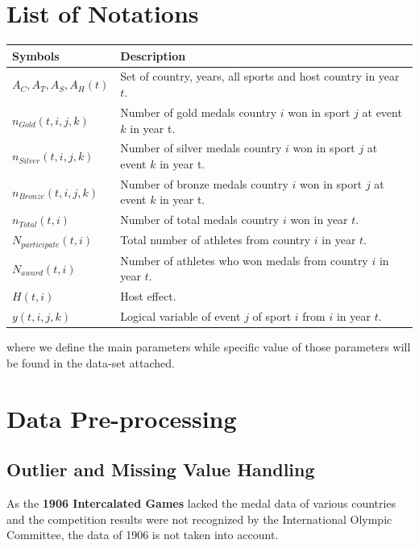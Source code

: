 \documentclass{mcmthesis}
\begin{document}
\section{List of Notations}
\begin{center}
\begin{tabular}{ll}
	\toprule
	{\bf Symbols} & {\bf Description}  \\
	\midrule 
	$A_{C},A_{T},A_{S},A_{H}(t)$ & Set of country, years, all sports and host country in year $t$.\\
	$n_{Gold}(t,i,j,k)$ & Number of gold medals country $i$ won in sport $j$ at event $k$ in year t. \\
	$n_{Silver}(t,i,j,k)$ & Number of silver medals country $i$ won in sport $j$ at event $k$ in year t. \\
	$n_{Bronze}(t,i,j,k)$ & Number of bronze medals country $i$ won in sport $j$ at event $k$ in year t. \\
	$n_{Total}(t,i)$ & Number of total medals country $i$ won in year $t$. \\
	$N_{participate}(t,i)$ & Total number of athletes from country $i$ in year $t$. \\
	$N_{award}(t,i)$ & Number of athletes who won medals from country $i$ in year $t$. \\
	$H(t,i)$ & Host effect. \\
	$y(t,i,j,k)$ &  Logical variable of event $j$ of sport $i$ from $i$ in year $t$. \\
	\bottomrule
\end{tabular}
\end{center}

\noindent where we define the main parameters while specific value of those 
parameters will be found in the data-set attached.











\section{Data Pre-processing}

\subsection{Outlier and Missing Value Handling}
As the \textbf{1906 Intercalated Games} lacked the medal data of various countries and the competition results were not recognized by the International Olympic Committee, the data of 1906 is not taken into account.
\end{document}
